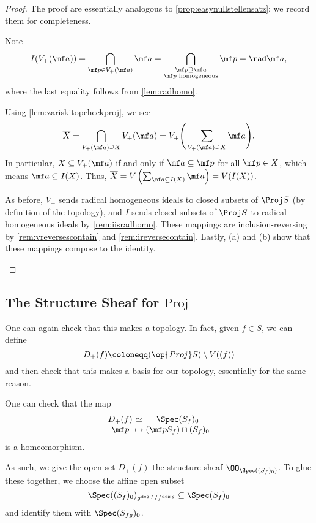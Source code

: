 \documentclass[../notes.tex]{subfiles}
\begin{document}
\begin{proof}
	The proof are essentially analogous to \autoref{prop:easynullstellensatz}; we record them for completeness.
	\begin{listalph}
		\item Note
		\[I(V_+(\mf a))=\bigcap_{\mf p\in V_+(\mf a)}\mf a=\bigcap_{\substack{\mf p\supseteq\mf a\\\mf p\text{ homogeneous}}}\mf p=\rad\mf a,\]
		where the last equality follows from \autoref{lem:radhomo}.
		\item Using \autoref{lem:zariskitopcheckproj}, we see
		\[\overline X=\bigcap_{V_+(\mf a)\supseteq X}V_+(\mf a)=V_+\Bigg(\sum_{V_+(\mf a)\supseteq X}\mf a\Bigg).\]
		In particular, $X\subseteq V_+(\mf a)$ if and only if $\mf a\subseteq\mf p$ for all $\mf p\in X$, which means $\mf a\subseteq I(X)$. Thus, $\overline X=V\left(\sum_{\mf a\subseteq I(X)}\mf a\right)=V(I(X))$.
		\item As before, $V_+$ sends radical homogeneous ideals to closed subsets of $\Proj S$ (by definition of the topology), and $I$ sends closed subsets of $\Proj S$ to radical homogeneous ideals by \autoref{rem:iisradhomo}. These mappings are inclusion-reversing by \autoref{rem:vreversescontain} and \autoref{rem:ireversecontain}. Lastly, (a) and (b) show that these mappings compose to the identity.
		\qedhere
	\end{listalph}
\end{proof}

\subsection{The Structure Sheaf for \texorpdfstring{$\mathrm{Proj}$}{\textrm{Proj}}}
One can again check that this makes a topology. In fact, given $f\in S$, we can define
\[D_+(f)\coloneqq(\op{Proj}S)\setminus V((f))\]
and then check that this makes a basis for our topology, essentially for the same reason.
\begin{remark}
	One can check that the map
	\[\arraycolsep=1.4pt\begin{array}{ccc}
		D_+(f) &\simeq& \Spec (S_f)_0 \\
		\mf p &\mapsto& (\mf pS_f)\cap(S_f)_0
	\end{array}\]
	is a homeomorphism.
\end{remark}
As such, we give the open set $D_+(f)$ the structure sheaf $\OO_{\Spec((S_f)_0)}$. To glue these together, we choose the affine open subset
\[\Spec((S_f)_0)_{g^{\deg f}/f^{\deg g}}\subseteq\Spec(S_f)_0\]
and identify them with $\Spec(S_{fg})_0$.
\end{document}
